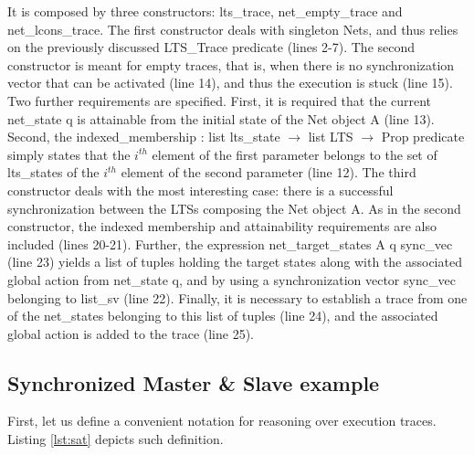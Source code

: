 			
	
	\noindent It is composed by three constructors: \textsf{lts\_trace},
	\textsf{net\_empty\_trace} and \textsf{net\_lcons\_trace}.
	The first constructor deals with singleton \textsf{Net}s, and thus relies on
	the previously discussed \textsf{LTS\_Trace} predicate (lines 2-7).		
	The second constructor is meant for empty traces, that is, when there is no
	synchronization vector that can be activated (line 14), 
	and thus the execution is stuck (line 15). Two further requirements are specified.
	First, it is required that the current \textsf{net\_state} \textsf{q} is 
	attainable from the initial state of the \textsf{Net} object \textsf{A} (line 13). Second, 
	the 
	\textsf{indexed\_membership : list lts\_state $\rightarrow$ list LTS $\rightarrow$ Prop}
	predicate simply states that the $i^{th}$ element of the first parameter belongs to the set of \textsf{lts\_states} 
	of the $i^{th}$ element of the second parameter (line 12).
	The third constructor deals with the most interesting case: there is a successful synchronization
	between the \ac{LTS}s composing the \textsf{Net} object \textsf{A}. As in the second constructor,
	the indexed membership and attainability requirements are also included (lines 20-21). 
	Further, the expression
	\textsf{net\_target\_states A q sync\_vec} (line 23) yields a list of tuples holding the 
	target states along with the associated global \textsf{action} from 
	\textsf{net\_state} \textsf{q}, and by using 
	a synchronization vector \textsf{sync\_vec} belonging to \textsf{list\_sv} (line 22).
	Finally, it is necessary to establish 
	a trace from one of the \textsf{net\_state}s belonging	
	to this list of tuples (line 24), and the associated global action 
	is added to the trace (line 25).	
	
		
		
\subsection{Synchronized Master \& Slave example}	
\label{sub:masterslave}

	
		First, let us define a convenient notation for reasoning over execution traces.
	Listing \ref{lst:sat} depicts such definition.
	
